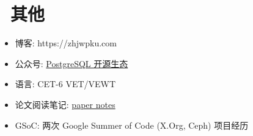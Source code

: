 \documentclass{resume}
\begin{document}
\section{\faCogs\ 其他}
\begin{itemize}[parsep=0.5ex]
  \item 博客: https://zhjwpku.com
  \item 公众号: \href{https://pg-x.github.io/images/wechat_qrcode.jpg}{PostgreSQL 开源生态}
  \item 语言: CET-6 VET/VEWT
  \item 论文阅读笔记: \href{https://paper-notes.zhjwpku.com/}{paper notes}
  \item GSoC: 两次 Google Summer of Code (X.Org, Ceph) 项目经历
\end{itemize}
\end{document}
